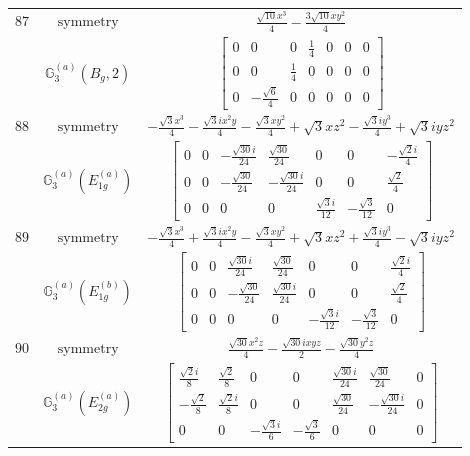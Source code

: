 \documentclass[fleqn,8pt,landscape]{jsarticle}
\begin{document}
\begin{longtable}{ccc}
$ 87 $ & $ \text{symmetry} $ & $ \frac{\sqrt{10} x^{3}}{4} - \frac{3 \sqrt{10} x y^{2}}{4} $ \\
$  $ & $ \mathbb{G}_{3}^{(a)}(B_{g},2) $ & $ \begin{bmatrix} 0 & 0 & 0 & \frac{1}{4} & 0 & 0 & 0 \\ 0 & 0 & \frac{1}{4} & 0 & 0 & 0 & 0 \\ 0 & - \frac{\sqrt{6}}{4} & 0 & 0 & 0 & 0 & 0 \end{bmatrix} $ \\ \hline
$ 88 $ & $ \text{symmetry} $ & $ - \frac{\sqrt{3} x^{3}}{4} - \frac{\sqrt{3} i x^{2} y}{4} - \frac{\sqrt{3} x y^{2}}{4} + \sqrt{3} x z^{2} - \frac{\sqrt{3} i y^{3}}{4} + \sqrt{3} i y z^{2} $ \\
$  $ & $ \mathbb{G}_{3}^{(a)}(E_{1g}^{(a)}) $ & $ \begin{bmatrix} 0 & 0 & - \frac{\sqrt{30} i}{24} & \frac{\sqrt{30}}{24} & 0 & 0 & - \frac{\sqrt{2} i}{4} \\ 0 & 0 & - \frac{\sqrt{30}}{24} & - \frac{\sqrt{30} i}{24} & 0 & 0 & \frac{\sqrt{2}}{4} \\ 0 & 0 & 0 & 0 & \frac{\sqrt{3} i}{12} & - \frac{\sqrt{3}}{12} & 0 \end{bmatrix} $ \\ \hline
$ 89 $ & $ \text{symmetry} $ & $ - \frac{\sqrt{3} x^{3}}{4} + \frac{\sqrt{3} i x^{2} y}{4} - \frac{\sqrt{3} x y^{2}}{4} + \sqrt{3} x z^{2} + \frac{\sqrt{3} i y^{3}}{4} - \sqrt{3} i y z^{2} $ \\
$  $ & $ \mathbb{G}_{3}^{(a)}(E_{1g}^{(b)}) $ & $ \begin{bmatrix} 0 & 0 & \frac{\sqrt{30} i}{24} & \frac{\sqrt{30}}{24} & 0 & 0 & \frac{\sqrt{2} i}{4} \\ 0 & 0 & - \frac{\sqrt{30}}{24} & \frac{\sqrt{30} i}{24} & 0 & 0 & \frac{\sqrt{2}}{4} \\ 0 & 0 & 0 & 0 & - \frac{\sqrt{3} i}{12} & - \frac{\sqrt{3}}{12} & 0 \end{bmatrix} $ \\ \hline
$ 90 $ & $ \text{symmetry} $ & $ \frac{\sqrt{30} x^{2} z}{4} - \frac{\sqrt{30} i x y z}{2} - \frac{\sqrt{30} y^{2} z}{4} $ \\
$  $ & $ \mathbb{G}_{3}^{(a)}(E_{2g}^{(a)}) $ & $ \begin{bmatrix} \frac{\sqrt{2} i}{8} & \frac{\sqrt{2}}{8} & 0 & 0 & \frac{\sqrt{30} i}{24} & \frac{\sqrt{30}}{24} & 0 \\ - \frac{\sqrt{2}}{8} & \frac{\sqrt{2} i}{8} & 0 & 0 & \frac{\sqrt{30}}{24} & - \frac{\sqrt{30} i}{24} & 0 \\ 0 & 0 & - \frac{\sqrt{3} i}{6} & - \frac{\sqrt{3}}{6} & 0 & 0 & 0 \end{bmatrix} $ \\ \hline

\end{longtable}
\end{document}
